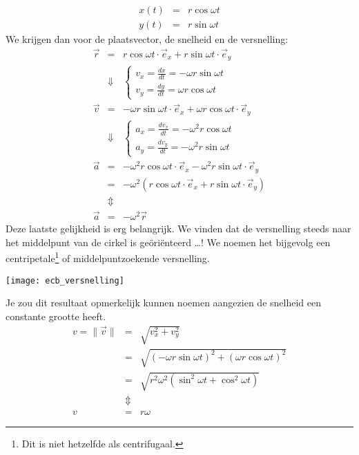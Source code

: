 \documentclass{ximera}
\begin{document}
\begin{eqnarray*}
	x(t)&=&r\cos\omega t\\
	y(t)&=&r\sin\omega t
\end{eqnarray*}
We krijgen dan voor de plaatsvector, de snelheid en de versnelling:
\begin{eqnarray}
	\vec{r}&=&r\cos\omega t\cdot\vec{e}_x+r\sin\omega t\cdot\vec{e}_y\nonumber\\
	&\Downarrow&
	\left\{
		\begin{array}{l}
			v_x=\frac{dx}{dt}=-\omega r\sin\omega t\\
			v_y=\frac{dy}{dt}=\omega r\cos\omega t
		\end{array}
	\right.\nonumber\\
	\vec{v}&=&-\omega r\sin\omega t\cdot\vec{e}_x+\omega r\cos\omega t\cdot\vec{e}_y\nonumber\\
	&\Downarrow&
	\left\{
		\begin{array}{l}
			a_x=\frac{dv_x}{dt}=-\omega^2 r\cos\omega t\\
			a_y=\frac{dv_y}{dt}=-\omega^2 r\sin\omega t
		\end{array}
	\right.\nonumber\\
	\vec{a}&=&-\omega^2 r\cos\omega t\cdot\vec{e}_x-\omega^2 r\sin\omega t\cdot\vec{e}_y\nonumber\\
	&=&-\omega^2(r\cos\omega t\cdot\vec{e}_x+r\sin\omega t\cdot\vec{e}_y)\nonumber\\
	&\Updownarrow&\nonumber\\
	\vec{a}&=&-\omega^2\vec{r}\label{versnelling}
\end{eqnarray}
Deze laatste gelijkheid is erg belangrijk. We vinden dat de versnelling steeds naar het middelpunt van de cirkel is ge\"ori\"enteerd \ldots! We noemen het bijgevolg een centripetale\footnote{Dit is niet hetzelfde als centrifugaal.} of middelpuntzoekende versnelling.
\begin{image}
	\texttt{[image: ecb\_versnelling]}
\end{image}
Je zou dit resultaat opmerkelijk kunnen noemen aangezien de snelheid een constante grootte heeft.
\begin{eqnarray}
	v=\parallel\vec{v}\parallel&=&\sqrt{v_x^2+v_y^2}\nonumber\\
	&=&\sqrt{(-\omega r\sin\omega t)^2+(\omega r\cos\omega t)^2}\nonumber\\
	&=&\sqrt{r^2\omega^2(\sin^2\omega t+\cos^2\omega t)}\nonumber\\
	&\Updownarrow&\nonumber\\
	v&=&r\omega\label{snelheid}
\end{eqnarray}
\end{document}
